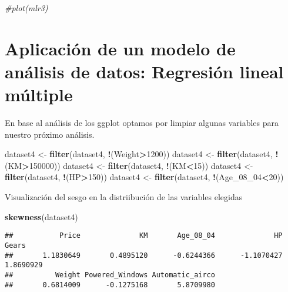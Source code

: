\documentclass[
]{article}
\newenvironment{Shaded}{\begin{snugshade}}{\end{snugshade}}
\newcommand{\CommentTok}[1]{\textcolor[rgb]{0.56,0.35,0.01}{\textit{#1}}}
\newcommand{\DecValTok}[1]{\textcolor[rgb]{0.00,0.00,0.81}{#1}}
\newcommand{\KeywordTok}[1]{\textcolor[rgb]{0.13,0.29,0.53}{\textbf{#1}}}
\newcommand{\NormalTok}[1]{#1}
\newcommand{\OperatorTok}[1]{\textcolor[rgb]{0.81,0.36,0.00}{\textbf{#1}}}
\newcommand{\StringTok}[1]{\textcolor[rgb]{0.31,0.60,0.02}{#1}}
\begin{document}
\begin{Shaded}
\begin{Highlighting}[]
\CommentTok{#plot(mlr3)}
\end{Highlighting}
\end{Shaded}

\hypertarget{aplicaciuxf3n-de-un-modelo-de-anuxe1lisis-de-datos-regresiuxf3n-lineal-muxfaltiple}{%
\section{Aplicación de un modelo de análisis de datos: Regresión lineal
múltiple}\label{aplicaciuxf3n-de-un-modelo-de-anuxe1lisis-de-datos-regresiuxf3n-lineal-muxfaltiple}}

En base al análisis de los ggplot optamos por limpiar algunas variables
para nuestro próximo análisis.

\begin{Shaded}
\begin{Highlighting}[]
\NormalTok{dataset4 <-}\StringTok{ }\KeywordTok{filter}\NormalTok{(dataset4, }\OperatorTok{!}\NormalTok{(Weight}\OperatorTok{>}\DecValTok{1200}\NormalTok{))}
\NormalTok{dataset4 <-}\StringTok{ }\KeywordTok{filter}\NormalTok{(dataset4,  }\OperatorTok{!}\NormalTok{(KM}\OperatorTok{>}\DecValTok{150000}\NormalTok{))}
\NormalTok{dataset4 <-}\StringTok{ }\KeywordTok{filter}\NormalTok{(dataset4, }\OperatorTok{!}\NormalTok{(KM}\OperatorTok{<}\DecValTok{15}\NormalTok{))}
\NormalTok{dataset4 <-}\StringTok{ }\KeywordTok{filter}\NormalTok{(dataset4, }\OperatorTok{!}\NormalTok{(HP}\OperatorTok{>}\DecValTok{150}\NormalTok{))}
\NormalTok{dataset4 <-}\StringTok{ }\KeywordTok{filter}\NormalTok{(dataset4, }\OperatorTok{!}\NormalTok{(Age_}\DecValTok{08}\NormalTok{_}\DecValTok{04}\OperatorTok{<}\DecValTok{20}\NormalTok{))}
\end{Highlighting}
\end{Shaded}

Visualización del sesgo en la distriibución de las variables elegidas

\begin{Shaded}
\begin{Highlighting}[]
\KeywordTok{skewness}\NormalTok{(dataset4)}
\end{Highlighting}
\end{Shaded}

\begin{verbatim}
##           Price              KM       Age_08_04              HP           Gears 
##       1.1830649       0.4895120      -0.6244366      -1.1070427       1.8690929 
##          Weight Powered_Windows Automatic_airco 
##       0.6814009      -0.1275168       5.8709980
\end{verbatim}
\end{document}
